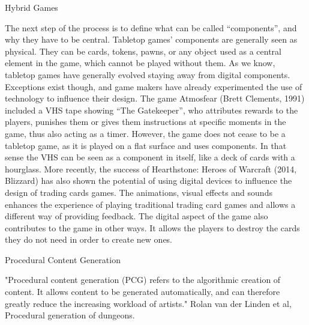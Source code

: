 Hybrid Games

The next step of the process is to define what can be called “components”, and why they have to be central. Tabletop games’ components are generally seen as physical. They can be cards, tokens, pawns, or any object used as a central element in the game, which cannot be played without them.  As we know, tabletop games have generally evolved staying away from digital components. Exceptions exist though, and game makers have already experimented the use of technology to influence their design. The game Atmosfear (Brett Clements, 1991) included a VHS tape showing “The Gatekeeper”, who attributes rewards to the players, punishes them or gives them instructions at specific moments in the game, thus also acting as a timer. However, the game does not cease to be a tabletop game, as it is played on a flat surface and uses components. In that sense the VHS can be seen as a component in itself, like a deck of cards with a hourglass. 
More recently, the success of Hearthstone: Heroes of Warcraft (2014, Blizzard) has also shown the potential of using digital devices to influence the design of trading cards games. The animations, visual effects and sounds enhances the experience of playing traditional trading card games and allows a different way of providing feedback. The digital aspect of the game also contributes to the game in other ways. It allows the players to destroy the cards they do not need in order to create new ones.




Procedural Content Generation

"Procedural content generation (PCG) refers to the algorithmic creation of content. It allows content to be generated automatically, and can therefore greatly reduce the increasing workload of artists." Rolan van der Linden et al, Procedural generation of dungeons.